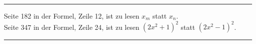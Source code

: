\begin{center}

\medskip
\rule{1.5cm}{0.4pt}
\end{center}

Seite 182 in der Formel, Zeile 12, ist zu lesen $x_m$ statt $x_n$.\\
Seite 347 in der Formel, Zeile 24, ist zu lesen $(2x^2+1)^2$ statt $(2x^2-1)^2$.

\begin{center}
\medskip
\rule{4cm}{0.4pt}
\end{center}
